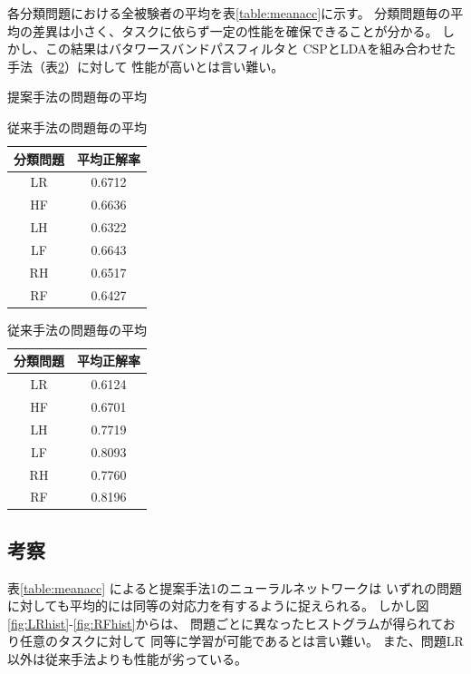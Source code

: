 各分類問題における全被験者の平均を表\ref{table:meanacc}に示す。
分類問題毎の平均の差異は小さく、タスクに依らず一定の性能を確保できることが分かる。
しかし、この結果はバタワースバンドパスフィルタと
CSPとLDAを組み合わせた手法\cite{benth}（表\ref{table:meanacc_csp}）に対して
性能が高いとは言い難い。
\begin{table}[t]
    \begin{minipage}{0.5\hsize}
        \centering
        \caption{提案手法の問題毎の平均}
        \begin{tabular}{|c|c|} \hline
            分類問題 & 平均正解率 \\ \hline
            LR & 0.6712 \\ \hline
            HF & 0.6636 \\ \hline
            LH & 0.6322 \\ \hline
            LF & 0.6643 \\ \hline
            RH & 0.6517 \\ \hline
            RF & 0.6427 \\ \hline
        \end{tabular}
        \label{table:meanacc}
    \end{minipage}
    \begin{minipage}{0.5\hsize}
        \centering
        \caption{従来手法の問題毎の平均}
        \begin{tabular}{|c|c|} \hline
            分類問題 & 平均正解率 \\ \hline
            LR & 0.6124 \\ \hline
            HF & 0.6701 \\ \hline
            LH & 0.7719 \\ \hline
            LF & 0.8093 \\ \hline
            RH & 0.7760 \\ \hline
            RF & 0.8196 \\ \hline
        \end{tabular}
        \label{table:meanacc_csp}
    \end{minipage}
\end{table}

\subsection{\mc 考察}
表\ref{table:meanacc} によると提案手法1のニューラルネットワークは
いずれの問題に対しても平均的には同等の対応力を有するように捉えられる。
しかし図\ref{fig:LRhist}-\ref{fig:RFhist}からは、
問題ごとに異なったヒストグラムが得られており任意のタスクに対して
同等に学習が可能であるとは言い難い。
また、問題LR以外は従来手法よりも性能が劣っている。

